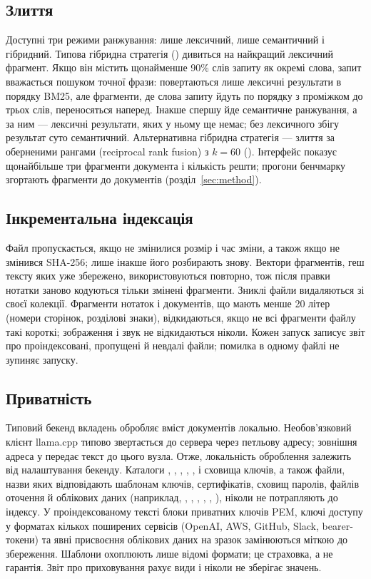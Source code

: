 \subsection{Злиття}
Доступні три режими ранжування: лише лексичний, лише семантичний і гібридний. Типова гібридна стратегія () дивиться на найкращий лексичний фрагмент. Якщо він містить щонайменше 90\% слів запиту як окремі слова, запит вважається пошуком точної фрази: повертаються лише лексичні результати в порядку BM25, але фрагменти, де слова запиту йдуть по порядку з проміжком до трьох слів, переносяться наперед. Інакше спершу йде семантичне ранжування, а за ним --- лексичні результати, яких у ньому ще немає; без лексичного збігу результат суто семантичний. Альтернативна гібридна стратегія --- злиття за оберненими рангами (reciprocal rank fusion) з $k=60$ (). Інтерфейс показує щонайбільше три фрагменти документа і кількість решти; прогони бенчмарку згортають фрагменти до документів (розділ~\ref{sec:method}).

\subsection{Інкрементальна індексація}
Файл пропускається, якщо не змінилися розмір і час зміни, а також якщо не змінився SHA-256; лише інакше його розбирають знову. Вектори фрагментів, геш тексту яких уже збережено, використовуються повторно, тож після правки нотатки заново кодуються тільки змінені фрагменти. Зниклі файли видаляються зі своєї колекції. Фрагменти нотаток і документів, що мають менше 20 літер (номери сторінок, розділові знаки), відкидаються, якщо не всі фрагменти файлу такі короткі; зображення і звук не відкидаються ніколи. Кожен запуск записує звіт про проіндексовані, пропущені й невдалі файли; помилка в одному файлі не зупиняє запуску.

\subsection{Приватність}
Типовий бекенд вкладень обробляє вміст документів локально. Необов'язковий клієнт llama.cpp типово звертається до сервера через петльову адресу; зовнішня адреса у  передає текст до цього вузла. Отже, локальність оброблення залежить від налаштування бекенду. Каталоги , , , , ,  і сховища ключів, а також файли, назви яких відповідають шаблонам ключів, сертифікатів, сховищ паролів, файлів оточення й облікових даних (наприклад, , , , , , ), ніколи не потрапляють до індексу. У проіндексованому тексті блоки приватних ключів PEM, ключі доступу у форматах кількох поширених сервісів (OpenAI, AWS, GitHub, Slack, bearer-токени) та явні присвоєння облікових даних на зразок  замінюються міткою до збереження. Шаблони охоплюють лише відомі формати; це страховка, а не гарантія. Звіт про приховування рахує види і ніколи не зберігає значень.

